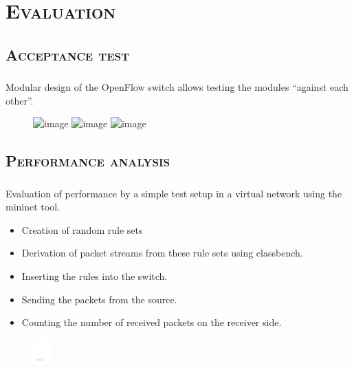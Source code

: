 \documentclass[xcolor=x11names,compress]{beamer}
\renewcommand{\(}{\begin{columns}}
\renewcommand{\)}{\end{columns}}
\newcommand{\<}[1]{\begin{column}{#1}}
\renewcommand{\>}{\end{column}}
\begin{document}
\section{\scshape Evaluation}
\begin{frame}
  \centering\Huge{\insertsection}
\end{frame}

\subsection{\scshape Acceptance test}
\begin{frame}
  \frametitle{\insertsubsection}
  Modular design of the OpenFlow switch allows testing the modules \enquote{against each other}.
  \begin{figure}
  \centering
  \includegraphics<1>[height=6cm]{figures/acctest-L1}
  \includegraphics<2>[height=6cm]{figures/acctest-L1-2}
  \includegraphics<3>[height=6cm]{figures/acctest-L1-3}
  \end{figure}
\end{frame}

\subsection{\scshape Performance analysis}
\begin{frame}
  \frametitle{\insertsubsection}
  Evaluation of performance by a simple test setup in a virtual network using the \textsf{mininet} tool.
  \begin{itemize}
    \item Creation of random rule sets
    \item Derivation of packet streams from these rule sets using \textsf{classbench}.
    \item Inserting the rules into the switch.
    \item Sending the packets from the source.
    \item Counting the number of received packets on the receiver side.
  \end{itemize}
  \begin{figure}
  \centering
  \includegraphics[height=1cm]{figures/ofswitch-perftest}
  \end{figure}
\end{frame}
\end{document}
